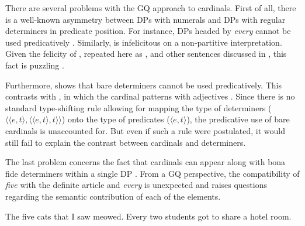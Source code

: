 \documentclass[output=paper]{langscibook}
\begin{document}
There are several problems with the GQ approach to cardinals. First of all, there is a well-known asymmetry between DPs with numerals and DPs with regular determiners in predicate position. For instance, DPs headed by \textit{every} cannot be used predicatively . Similarly,  is infelicitous on a non-partitive interpretation. Given the felicity of , repeated here as , and other sentences discussed in , this fact is puzzling \citep[][]{landman2003predicate}.

\ea {}\label{ex:quantifiers-predicate-every}
\label{ex:quantifiers-predicate-most}
\label{ex:uses-predicative-2}
\z
\z

\noindent Furthermore,  shows that bare determiners cannot be used predicatively. This contrasts with , in which the cardinal patterns with adjectives . Since there is no standard type-shifting rule allowing for mapping the type of determiners ($\langle\langle e,t\rangle,\langle\langle e,t\rangle,t\rangle\rangle$) onto the type of predicates ($\langle e,t\rangle$), the predicative use of bare cardinals is unaccounted for. But even if such a rule were postulated, it would still fail to explain the contrast between cardinals and determiners. 

\ea {}\label{ex:quantifiers-predicate-bare}
\label{ex:adjectives-predicate}
\z
\z

\noindent The last problem concerns the fact that cardinals can appear along with bona fide determiners within a single DP \citep[e.g.,][]{rothstein2017semantics}. From a GQ perspective, the compatibility of \textit{five} with the definite article  and \textit{every}  is unexpected and raises questions regarding the semantic contribution of each of the elements.

\ea\label{ex:cardinals-the-every} \ea The five cats that I saw meowed.\label{ex:cardinals-the}
\ex Every two students got to share a hotel room.\label{ex:cardinals-every} 
\z
\z
\end{document}
